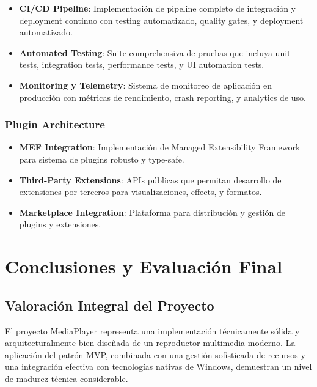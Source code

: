 \documentclass[a4paper]{article}
\begin{document}
\begin{itemize}
\item \textbf{CI/CD Pipeline}: Implementación de pipeline completo de integración y deployment continuo con testing automatizado, quality gates, y deployment automatizado.

\item \textbf{Automated Testing}: Suite comprehensiva de pruebas que incluya unit tests, integration tests, performance tests, y UI automation tests.

\item \textbf{Monitoring y Telemetry}: Sistema de monitoreo de aplicación en producción con métricas de rendimiento, crash reporting, y analytics de uso.
\end{itemize}

\subsubsection{Plugin Architecture}

\begin{itemize}
\item \textbf{MEF Integration}: Implementación de Managed Extensibility Framework para sistema de plugins robusto y type-safe.

\item \textbf{Third-Party Extensions}: APIs públicas que permitan desarrollo de extensiones por terceros para visualizaciones, effects, y formatos.

\item \textbf{Marketplace Integration}: Plataforma para distribución y gestión de plugins y extensiones.
\end{itemize}

\section{Conclusiones y Evaluación Final}

\subsection{Valoración Integral del Proyecto}

El proyecto MediaPlayer representa una implementación técnicamente sólida y arquitecturalmente bien diseñada de un reproductor multimedia moderno. La aplicación del patrón MVP, combinada con una gestión sofisticada de recursos y una integración efectiva con tecnologías nativas de Windows, demuestran un nivel de madurez técnica considerable.
\end{document}
